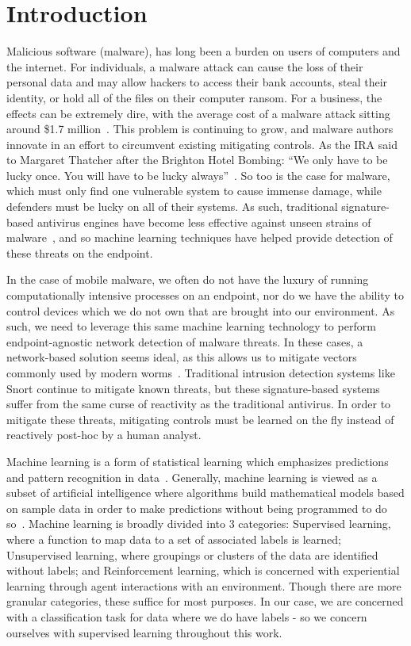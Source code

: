 \chapter{Introduction}
\label{chap:intro}

Malicious software (malware), has long been a burden on users of computers and the internet. 
For individuals, a malware attack can cause the loss of their personal data and may allow hackers to access their bank accounts, steal their identity, or hold all of the files on their computer ransom. 
For a business, the effects can be extremely dire, with the average cost of a malware attack sitting around \$1.7 million~\cite{seals2019threatlist}. 
This problem is continuing to grow, and malware authors innovate in an effort to circumvent existing mitigating controls. 
As the IRA said to Margaret Thatcher after the Brighton Hotel Bombing: ``We only have to be lucky once. You will have to be lucky always''~\cite{thomas1984this}. 
So too is the case for malware, which must only find one vulnerable system to cause immense damage, while defenders must be lucky on all of their systems. 
As such, traditional signature-based antivirus engines have become less effective against unseen strains of malware~\cite{oconnor2017how}, and so machine learning techniques have helped provide detection of these threats on the endpoint.

In the case of mobile malware, we often do not have the luxury of running computationally intensive processes on an endpoint, nor do we have the ability to control devices which we do not own that are brought into our environment. 
As such, we need to leverage this same machine learning technology to perform endpoint-agnostic network detection of malware threats. 
In these cases, a network-based solution seems ideal, as this allows us to mitigate vectors commonly used by modern worms~\cite{mohurle2017brief}. 
Traditional intrusion detection systems like Snort continue to mitigate known threats, but these signature-based systems suffer from the same curse of reactivity as the traditional antivirus. 
In order to mitigate these threats, mitigating controls must be learned on the fly instead of reactively post-hoc by a human analyst.

Machine learning is a form of statistical learning which emphasizes predictions and pattern recognition in data~\cite{james14introduction}.
Generally, machine learning is viewed as a subset of artificial intelligence where algorithms build mathematical models based on sample data in order to make predictions without being programmed to do so~\cite{bishop2006pattern}.
Machine learning is broadly divided into 3 categories: 
Supervised learning, where a function to map data to a set of associated labels is learned;
Unsupervised learning, where groupings or clusters of the data are identified without labels;
and Reinforcement learning, which is concerned with experiential learning through agent interactions with an environment.
Though there are more granular categories, these suffice for most purposes.
In our case, we are concerned with a classification task for data where we do have labels - so we concern ourselves with supervised learning throughout this work. 


